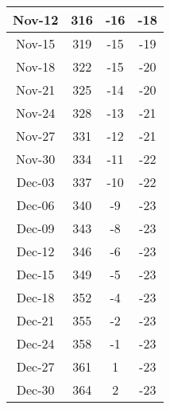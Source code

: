 \begin{longtable}{c | c | c | c}
	Nov-12 & 316 & -16 & -18\\\hline
	Nov-15 & 319 & -15 & -19\\\hline
	Nov-18 & 322 & -15 & -20\\\hline
	Nov-21 & 325 & -14 & -20\\\hline
	Nov-24 & 328 & -13 & -21\\\hline
	Nov-27 & 331 & -12 & -21\\\hline
	Nov-30 & 334 & -11 & -22\\\hline
	Dec-03 & 337 & -10 & -22\\\hline
	Dec-06 & 340 & -9 & -23\\\hline
	Dec-09 & 343 & -8 & -23\\\hline
	Dec-12 & 346 & -6 & -23\\\hline
	Dec-15 & 349 & -5 & -23\\\hline
	Dec-18 & 352 & -4 & -23\\\hline
	Dec-21 & 355 & -2 & -23\\\hline
	Dec-24 & 358 & -1 & -23\\\hline
	Dec-27 & 361 & 1 & -23\\\hline
	Dec-30 & 364 & 2 & -23\\\hline
\end{longtable}

​\newpage




